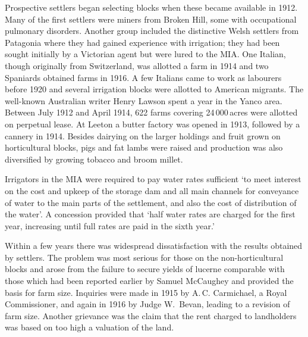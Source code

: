 Prospective settlers began selecting blocks when these became
available in 1912.  Many of the first settlers were miners from Broken
Hill, some with occupational pulmonary disorders.  Another group
included the distinctive Welsh settlers from Patagonia
where they had gained experience with irrigation; they had been sought
initially by a Victorian agent but were lured to the MIA.  One
Italian, though originally from Switzerland, was
allotted a farm in 1914 and two Spaniards obtained
farms in 1916.  A few Italians came to work as labourers before 1920
and several irrigation blocks were allotted to
American migrants.  The well-known Australian writer
Henry Lawson   spent a year in the Yanco area.
Between July 1912 and April 1914, 622 farms covering 24\,000\,acres
were allotted on perpetual lease.  At Leeton a
butter factory was opened in 1913, followed by a cannery in 1914.
Besides dairying on the larger holdings and
fruit grown on horticultural blocks, pigs and fat lambs
were raised and production was also diversified by growing
tobacco and broom millet.

Irrigators in the MIA were required to pay water rates sufficient `to
meet interest on the cost and upkeep of the storage
dam and all main
channels for conveyance of water to the main
parts of the settlement, and also the cost of distribution of the
water'. A concession provided that `half water rates are charged for
the first year, increasing until full rates are paid in the sixth
year.'

Within a few years there was widespread dissatisfaction with the
results obtained by settlers.  The problem was most serious for those
on the non-horticultural blocks and arose from the failure to secure
yields of lucerne comparable with those which had been reported
earlier by Samuel McCaughey and provided the
basis for farm size.  Inquiries were made in 1915 by
A.\,C. Carmichael, a Royal Commissioner, and again in 1916 by Judge
W.~Bevan, leading to a revision of farm size.  Another grievance was
the claim that the rent charged to landholders was based on too high a
valuation of the land.

